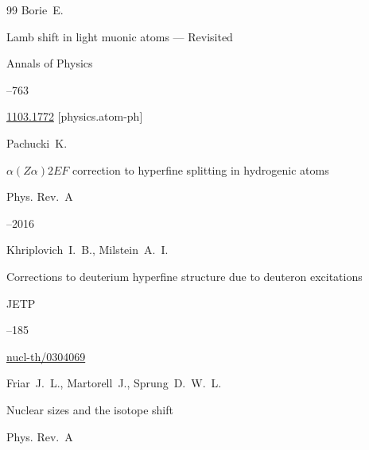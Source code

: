 \begin{thebibliography}{99}
\by Borie~E.

\paper Lamb shift in light muonic atoms — Revisited

\jour Annals of Physics




--763


\arxiv \href{http://arxiv.org/abs/1103.1772}{1103.1772} [physics.atom-ph]




\by Pachucki~K.

\paper  $\alpha(Z\alpha)2EF$ correction to hyperfine splitting in hydrogenic atoms

\jour Phys. Rev.~A




--2016





\by Khriplovich~I.~B., Milstein~A.~I.

\paper Corrections to deuterium hyperfine structure due to deuteron excitations

\jour JETP




--185


\arxiv \href{http://arxiv.org/abs/nucl-th/0304069}{nucl-th/0304069}




\by Friar~J.~L., Martorell~J., Sprung~D.~W.~L.

\paper Nuclear sizes and the isotope shift

\jour Phys. Rev.~A







\end{thebibliography}
